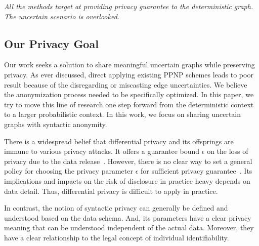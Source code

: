 \emph{All the methods target at providing privacy guarantee to the deterministic graph. The uncertain scenario is overlooked.}
\vspace{-5pt}
\subsection{Our Privacy Goal}
Our work seeks a solution to share meaningful uncertain graphs while preserving privacy.
As ever discussed, direct applying existing PPNP schemes leads to poor result because of the disregarding or miscasting edge uncertainties. We believe the anonymization process needed to be specifically optimized. In this paper, we try to move this line of research one step forward from the deterministic context to a larger probabilistic context. In this work, we focus on sharing uncertain graphs with syntactic anonymity. 

There is a widespread belief that differential privacy and its offsprings are immune to various privacy attacks. It offers a guarantee bound $\epsilon$ on the loss of privacy due to the data release~\cite{Sala_Sharing_2011,Xiao_Differentially_2014}. However, there is no clear way to set a general policy for choosing the privacy parameter $\epsilon$ for sufficient privacy guarantee~\cite{lee2011}. Its implications and impacts on the risk of disclosure in practice heavy depends on data detail. Thus, differential privacy is difficult to apply in practice. 

In contrast, the notion of syntactic privacy can generally be defined and understood based on the data schema. And, its parameters have a clear privacy meaning that can be understood independent of the actual data. Moreover, they have a clear relationship to the legal concept of individual identifiability. 


